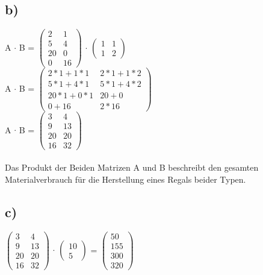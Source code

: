 \documentclass{article}
\begin{document}
	\subsection*{b)}
	A $\cdot$ B =
	$\left(
	\begin{array}{cc}
	2&1\\5&4 \\20&0 \\0&16
	\end{array}
	\right)$
	$\cdot$
	$\left(
	\begin{array}{cc}
	1&1\\1&2
	\end{array}
	\right)$
	\\
	A $\cdot$ B =
	$\left(
	\begin{array}{cc}
	 2 * 1 + 1 * 1 & 2* 1 + 1 *2 \\ 5 * 1 + 4 * 1& 5*1 + 4 * 2\\ 20 * 1 + 0 * 1& 20 + 0\\ 0 + 16 & 2 * 16
	\end{array}
	\right)$
	\\
	A $\cdot$ B =
	$\left(
	\begin{array}{cc}
	3 & 4\\ 9&13 \\20 & 20\\ 16& 32
	\end{array}
	\right)$ \\ \\
	Das Produkt der Beiden Matrizen A und B beschreibt den gesamten Materialverbrauch für die Herstellung eines Regals beider Typen.	
	\subsection*{c)}
	$\left(
	\begin{array}{cc}
	3 & 4\\ 9&13 \\20 & 20\\ 16& 32
	\end{array}
	\right)$
	$\cdot$
	$\left(
	\begin{array}{c}
	10 \\ 5
	\end{array}
	\right)$
	=
	$\left(
	\begin{array}{c}
	 50 \\ 155 \\ 300 \\ 320 
	\end{array}
	\right)$
	
\end{document}
